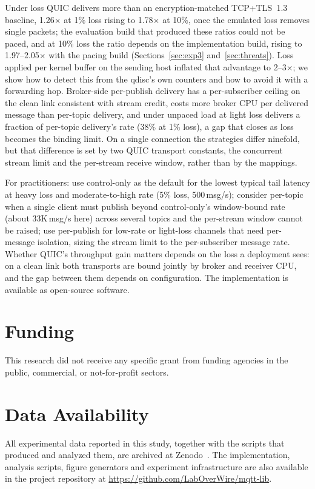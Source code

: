 \documentclass[a4paper,fleqn]{cas-dc}
\begin{document}
Under loss QUIC delivers more than an encryption-matched TCP+TLS~1.3 baseline, 1.26$\times$ at 1\% loss rising to 1.78$\times$ at 10\%, once the emulated loss removes single packets; the evaluation build that produced these ratios could not be paced, and at 10\% loss the ratio depends on the implementation build, rising to 1.97--2.05$\times$ with the pacing build (Sections~\ref{sec:exp3} and~\ref{sec:threats}). Loss applied per kernel buffer on the sending host inflated that advantage to 2--3$\times$; we show how to detect this from the qdisc's own counters and how to avoid it with a forwarding hop. Broker-side per-publish delivery has a per-subscriber ceiling on the clean link consistent with stream credit, costs more broker CPU per delivered message than per-topic delivery, and under unpaced load at light loss delivers a fraction of per-topic delivery's rate (38\% at 1\% loss), a gap that closes as loss becomes the binding limit. On a single connection the strategies differ ninefold, but that difference is set by two QUIC transport constants, the concurrent stream limit and the per-stream receive window, rather than by the mappings.

For practitioners: use control-only as the default for the lowest typical tail latency at heavy loss and moderate-to-high rate (5\% loss, 500\,msg/s); consider per-topic when a single client must publish beyond control-only's window-bound rate (about 33K\,msg/s here) across several topics and the per-stream window cannot be raised; use per-publish for low-rate or light-loss channels that need per-message isolation, sizing the stream limit to the per-subscriber message rate. Whether QUIC's throughput gain matters depends on the loss a deployment sees: on a clean link both transports are bound jointly by broker and receiver CPU, and the gap between them depends on configuration. The implementation is available as open-source software.

\section*{Funding}

This research did not receive any specific grant from funding agencies in the public, commercial, or not-for-profit sectors.

\section*{Data Availability}

All experimental data reported in this study, together with the scripts that produced and analyzed them, are archived at Zenodo~\cite{bracht2026zenodo}. The implementation, analysis scripts, figure generators and experiment infrastructure are also available in the project repository at \url{https://github.com/LabOverWire/mqtt-lib}.
\end{document}
